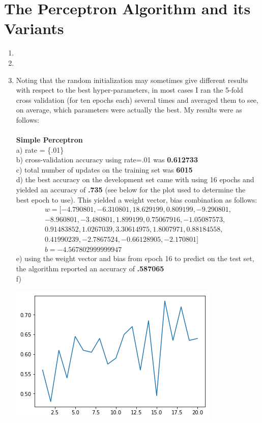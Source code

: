 \documentclass[11pt,a4paper]{article}
\begin{document}
	\section{The Perceptron Algorithm and its Variants}
		\begin{enumerate}
			\item
			\item
			\item Noting that the random initialization may sometimes give different results with respect to the best hyper-parameters, in most cases I ran the 5-fold cross validation (for ten epochs each) several times and averaged them to see, on average, which parameters were actually the best. My results were as follows:\\ \\
			\textbf{Simple Perceptron}    \\
			a) rate = \{.01\}  \\
			b) cross-validation accuracy using rate=.01 was \textbf{0.612733}\\
			c) total number of updates on the training set was \textbf{6015}\\
			d) the best accuracy on the development set came with using 16 epochs and yielded an accuracy of \textbf{.735} (see below for the plot used to determine the best epoch to use). This yielded a weight vector, bias combination as follows:\\
			\begin{gather}
				w = [-4.790801  , -6.310801  , 18.629199  ,  0.809199  , -9.290801,\\
				-8.960801  , -3.480801  ,  1.899199  ,  0.75067916, -1.05087573,\\
				0.91483852,  1.0267039 ,  3.30614975,  1.8007971 ,  0.88184558,\\
				0.41990239, -2.7867524 , -0.66128905, -2.170801  ] \\
				b = -4.567802999999947
			\end{gather}
			e) using the weight vector and bias from epoch 16 to predict on the test set, the algorithm reported an accuracy of \textbf{.587065} \\
			f)
			\begin{center}
				\includegraphics[width=0.7\linewidth]{simple_plot}

\end{center}
\end{enumerate}
\end{document}
